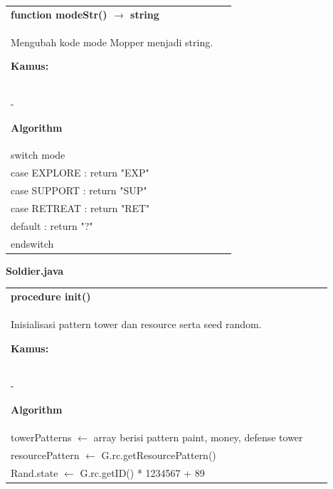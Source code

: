 \documentclass{article}
\newenvironment{pseudobox}
{
\centering
\begin{longtable}{|p{0.94\linewidth}|}
\hline
}
{
\\ \hline
\end{longtable}
\vspace{0.05cm}
}
\begin{document}
\begin{pseudobox}
\textbf{function modeStr() $\rightarrow$ string} \\
{ Mengubah kode mode Mopper menjadi string. }

\textbf{Kamus:} \\
\hspace*{1em} -

\textbf{Algorithm} \\
\hspace*{1em} switch mode \\
\hspace*{2em} case EXPLORE : return "EXP" \\
\hspace*{2em} case SUPPORT : return "SUP" \\
\hspace*{2em} case RETREAT : return "RET" \\
\hspace*{2em} default      : return "?" \\
\hspace*{1em} endswitch
\end{pseudobox}



\item \textbf{Soldier.java}

\begin{pseudobox}
\textbf{procedure init()} \\
{ Inisialisasi pattern tower dan resource serta seed random. }

\textbf{Kamus:} \\
\hspace*{1em} -

\textbf{Algorithm} \\
\hspace*{1em} towerPatterns $\leftarrow$ array berisi pattern paint, money, defense tower \\
\hspace*{1em} resourcePattern $\leftarrow$ G.rc.getResourcePattern() \\
\hspace*{1em} Rand.state $\leftarrow$ G.rc.getID() * 1234567 + 89
\end{pseudobox}
\end{document}
